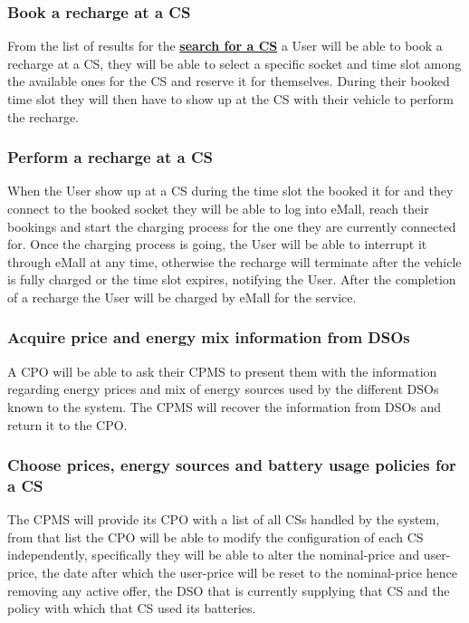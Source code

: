 \documentclass[11pt]{article}
\begin{document}
\subsubsection{Book a recharge at a CS}

From the list of results for the \hyperref[subsubsection:searchForCS]{\textbf{search for a CS}} a User will be able to book a recharge at a CS, they will be able to select a specific socket and time slot among the available ones for the CS and reserve it for themselves. During their booked time slot they will then have to show up at the CS with their vehicle to perform the recharge.

\subsubsection{Perform a recharge at a CS}

When the User show up at a CS during the time slot the booked it for and they connect to the booked socket they will be able to log into eMall, reach their bookings and start the charging process for the one they are currently connected for. Once the charging process is going, the User will be able to interrupt it through eMall at any time, otherwise the recharge will terminate after the vehicle is fully charged or the time slot expires, notifying the User. After the completion of a recharge the User will be charged by eMall for the service.

\subsubsection{Acquire price and energy mix information from DSOs}

A CPO will be able to ask their CPMS to present them with the information regarding energy prices and mix of energy sources used by the different DSOs known to the system. The CPMS will recover the information from DSOs and return it to the CPO.

\subsubsection{Choose prices, energy sources and battery usage policies for a CS}

The CPMS will provide its CPO with a list of all CSs handled by the system, from that list the CPO will be able to modify the configuration of each CS independently, specifically they will be able to alter the nominal-price and user-price, the date after which the user-price will be reset to the nominal-price hence removing any active offer, the DSO that is currently supplying that CS and the policy with which that CS used its batteries.
\end{document}
